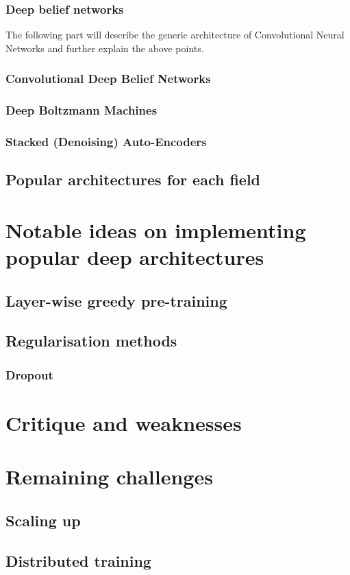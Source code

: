 \documentclass[a4paper]{report}
\begin{document}
		\subsubsection{Deep belief networks}
			The following part will describe the generic architecture of Convolutional Neural Networks and further explain the above points.
		\subsubsection{Convolutional Deep Belief Networks}
		\subsubsection{Deep Boltzmann Machines}
		\subsubsection{Stacked (Denoising) Auto-Encoders}
	\subsection{Popular architectures for each field}
\section{Notable ideas on implementing popular deep architectures}
	\subsection{Layer-wise greedy pre-training}
	\subsection{Regularisation methods}
		\subsubsection{Dropout}
\section{Critique and weaknesses}
\section{Remaining challenges}
	\subsection{Scaling up}
	\subsection{Distributed training}
\end{document}
